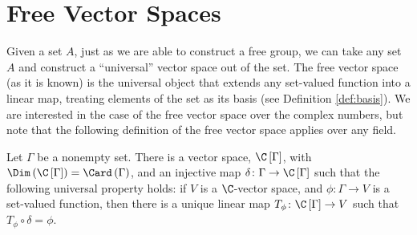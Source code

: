 \section{Free Vector Spaces}%
Given a set $A$, just as we are able to construct a free group, we can take any set $A$ and construct a ``universal'' vector space out of the set. The free vector space (as it is known) is the universal object that extends any set-valued function into a linear map, treating elements of the set as its basis (see Definition \ref{def:basis}). We are interested in the case of the free vector space over the complex numbers, but note that the following definition of the free vector space applies over any field. 
\begin{theorem}\label{thm:free_vector_space}
  Let $\Gamma$ be a nonempty set. There is a vector space, $\C\left[\Gamma\right]$, with $\Dim\left(\C\left[\Gamma\right]\right) = \Card\left(\Gamma\right)$, and an injective map $\delta\colon \Gamma\rightarrow \C\left[\Gamma\right]$ such that the following universal property holds: if $V$ is a $\C$-vector space, and $\phi\colon \Gamma\rightarrow V$ is a set-valued function, then there is a unique linear map $T_{\phi}\colon \C\left[\Gamma\right]\rightarrow V$ such that $T_{\phi}\circ \delta = \phi$.
  \begin{center}
  \end{center}
\end{theorem}
